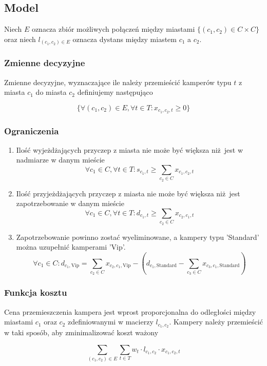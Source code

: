 \documentclass[a4paper,11pt]{article}
\theoremstyle{mytheor}
\begin{document}
\subsection*{Model}
Niech $E$ oznacza zbiór możliwych połączeń między miastami $\{(c_1, c_2) \in C\times C\}$ oraz niech $l_{(c_1, c_2)\in E}$ oznacza dystans między miastem $c_1$ a $c_2$.

\subsubsection*{Zmienne decyzyjne}
Zmienne decyzyjne, wyznaczające ile należy przemieścić kamperów typu $t$ z miasta $c_1$ do miasta $c_2$ definiujemy następująco

$$
    \{\forall (c_1, c_2)\in E, \forall t\in T: x_{c_1, c_2, t} \geq 0\}
$$

\subsubsection*{Ograniczenia}
\begin{enumerate}
    \item Ilość wyjeżdżających przyczep z miasta nie może być większa niż jest w nadmiarze w danym mieście
          $$
              \forall c_1\in C, \forall t\in T: s_{c_1,t} \geq \sum_{c_2\in C} x_{c_1, c_2, t}
          $$
    \item Ilość przyjeżdżających przyczep z miasta nie może być większa niż jest zapotrzebowanie w danym mieście
          $$
              \forall c_1\in C, \forall t\in T: d_{c_1,t} \geq \sum_{c_2\in C} x_{c_2, c_1, t}
          $$
    \item Zapotrzebowanie powinno zostać wyeliminowane, a kampery typu 'Standard' można uzupełnić kamperami 'Vip'.
          $$
              \forall c_1\in C: d_{c_1, \text{Vip}} = \sum_{c_2\in C} x_{c_2,c_1,\text{Vip}} - (d_{c_1,\text{Standard}} - \sum_{c_3\in C} x_{c_3,c_1,\text{Standard}})
          $$
\end{enumerate}

\subsubsection*{Funkcja kosztu}
Cena przemieszczenia kampera jest wprost proporcjonalna do odległości między miastami $c_1$ oraz $c_2$ zdefiniowanymi w macierzy $l_{c_1,c_2}$. Kampery należy przemieścić w taki sposób, aby zminimalizować koszt ważony

$$
    \sum_{(c_1, c_2)\in E} \sum_{t\in T} w_{t} \cdot l_{c_1, c_2} \cdot x_{c_1, c_2, t}
$$
\end{document}

